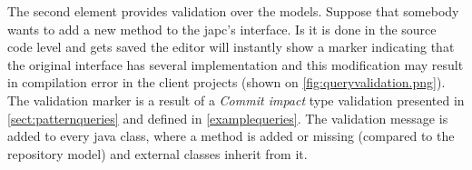 The second element provides validation over the models. Suppose that somebody
wants to add a new  method to the japc's 
interface. Is it is done in the source code level and gets saved the editor will
instantly show a marker indicating that the original interface has several
implementation and this modification may result in compilation error in the
client projects (shown on \autoref{fig:queryvalidation.png}).
 The validation marker is a result of a \emph{Commit impact} type
validation presented in \autoref{sect:patternqueries} and defined in
\autoref{examplequeries}. The validation message is added to every java class,
where a method is added or missing (compared to the repository model) and
external classes inherit from it.
 
 